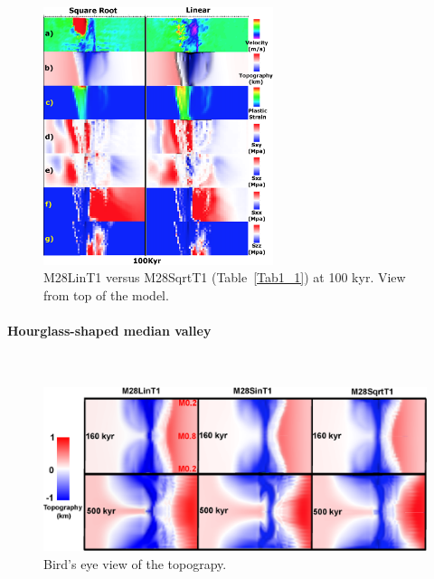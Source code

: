 \begin{figure}[h]
  \centering
    \includegraphics[width=0.6\textwidth]{./Figures/fig_Results4_3_sqrt_vs_lin_cut_back_100kyr.eps}
  \caption{M28LinT1 versus M28SqrtT1 (Table~\hyperref[Tab1_1]{\ref{Tab1_1}}) at 100 kyr. View from top of the model.}
 \label{fig_Results4_3_2}
\end{figure} 
\fi

\paragraph{Hourglass-shaped median valley}
~\\
\begin{figure}[h]
  \centering
    \includegraphics[width=1.0\textwidth]{./Figures/fig_Results_3_3_1_hourglass.eps}
  \caption{Bird's eye view of the topograpy.  }
 \label{fig_Results_3_3_1_hourglass}
\end{figure} 

